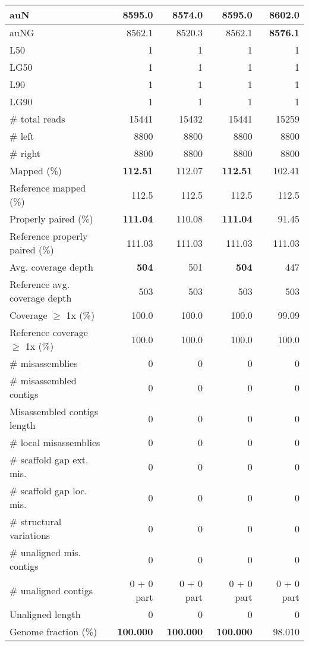 \documentclass[12pt,a4paper]{article}
\begin{document}
\begin{table}[ht]
\begin{center}
\begin{tabular}{|l*{4}{|r}|}
auN & 8595.0 & 8574.0 & 8595.0 & {\bf 8602.0} \\ \hline
auNG & 8562.1 & 8520.3 & 8562.1 & {\bf 8576.1} \\ \hline
L50 & 1 & 1 & 1 & 1 \\ \hline
LG50 & 1 & 1 & 1 & 1 \\ \hline
L90 & 1 & 1 & 1 & 1 \\ \hline
LG90 & 1 & 1 & 1 & 1 \\ \hline
\# total reads & 15441 & 15432 & 15441 & 15259 \\ \hline
\# left & 8800 & 8800 & 8800 & 8800 \\ \hline
\# right & 8800 & 8800 & 8800 & 8800 \\ \hline
Mapped (\%) & {\bf 112.51} & 112.07 & {\bf 112.51} & 102.41 \\ \hline
Reference mapped (\%) & 112.5 & 112.5 & 112.5 & 112.5 \\ \hline
Properly paired (\%) & {\bf 111.04} & 110.08 & {\bf 111.04} & 91.45 \\ \hline
Reference properly paired (\%) & 111.03 & 111.03 & 111.03 & 111.03 \\ \hline
Avg. coverage depth & {\bf 504} & 501 & {\bf 504} & 447 \\ \hline
Reference avg. coverage depth & 503 & 503 & 503 & 503 \\ \hline
Coverage $\geq$ 1x (\%) & 100.0 & 100.0 & 100.0 & 99.09 \\ \hline
Reference coverage $\geq$ 1x (\%) & 100.0 & 100.0 & 100.0 & 100.0 \\ \hline
\# misassemblies & 0 & 0 & 0 & 0 \\ \hline
\# misassembled contigs & 0 & 0 & 0 & 0 \\ \hline
Misassembled contigs length & 0 & 0 & 0 & 0 \\ \hline
\# local misassemblies & 0 & 0 & 0 & 0 \\ \hline
\# scaffold gap ext. mis. & 0 & 0 & 0 & 0 \\ \hline
\# scaffold gap loc. mis. & 0 & 0 & 0 & 0 \\ \hline
\# structural variations & 0 & 0 & 0 & 0 \\ \hline
\# unaligned mis. contigs & 0 & 0 & 0 & 0 \\ \hline
\# unaligned contigs & 0 + 0 part & 0 + 0 part & 0 + 0 part & 0 + 0 part \\ \hline
Unaligned length & 0 & 0 & 0 & 0 \\ \hline
Genome fraction (\%) & {\bf 100.000} & {\bf 100.000} & {\bf 100.000} & 98.010 \\ \hline

\end{tabular}
\end{center}
\end{table}
\end{document}
